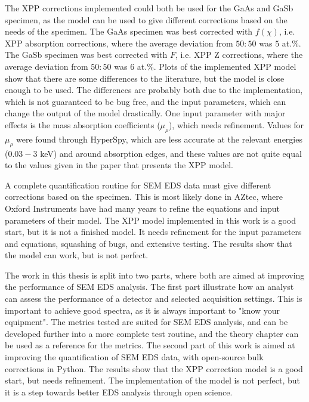 The XPP corrections implemented could both be used for the GaAs and GaSb specimen, as the model can be used to give different corrections based on the needs of the specimen.
The GaAs specimen was best corrected with $f(\chi)$, i.e. XPP absorption corrections, where the average deviation from $50:50$ was $5$ at.\%.
The GaSb specimen was best corrected with $F$, i.e. XPP Z corrections, where the average deviation from $50:50$ was $6$ at.\%.
Plots of the implemented XPP model show that there are some differences to the literature, but the model is close enough to be used.
The differences are probably both due to the implementation, which is not guaranteed to be bug free, and the input parameters, which can change the output of the model drastically.
One input parameter with major effects is the mass absorption coefficients ($\mu_\rho$), which needs refinement.
Values for $\mu_\rho$ were found through HyperSpy, which are less accurate at the relevant energies ($0.03-3$ keV) and around absorption edges, and these values are not quite equal to the values given in the paper that presents the XPP model.


A complete quantification routine for SEM EDS data must give different corrections based on the specimen.
This is most likely done in AZtec, where Oxford Instruments have had many years to refine the equations and input parameters of their model.
The XPP model implemented in this work is a good start, but it is not a finished model. 
It needs refinement for the input parameters and equations, squashing of bugs, and extensive testing.
The results show that the model can work, but is not perfect.



The work in this thesis is split into two parts, where both are aimed at improving the performance of SEM EDS analysis.
The first part illustrate how an analyst can assess the performance of a detector and selected acquisition settings.
This is important to achieve good spectra, as it is always important to "know your equipment".
The metrics tested are suited for SEM EDS analysis, and can be developed further into a more complete test routine, and the theory chapter can be used as a reference for the metrics.
The second part of this work is aimed at improving the quantification of SEM EDS data, with open-source bulk corrections in Python.
The results show that the XPP correction model is a good start, but needs refinement.
The implementation of the model is not perfect, but it is a step towards better EDS analysis through open science.
